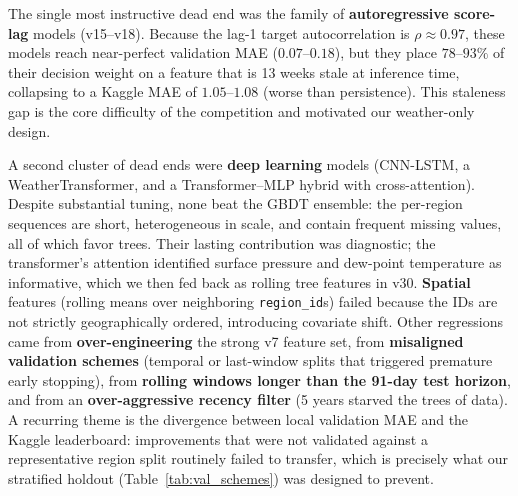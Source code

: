 \documentclass[conference]{IEEEtran}
\begin{document}
The single most instructive dead end was the family of \textbf{autoregressive score-lag} models (v15--v18). Because the lag-1 target autocorrelation is $\rho \approx 0.97$, these models reach near-perfect validation MAE ($0.07$--$0.18$), but they place $78$--$93\%$ of their decision weight on a feature that is 13 weeks stale at inference time, collapsing to a Kaggle MAE of $1.05$--$1.08$ (worse than persistence). This staleness gap is the core difficulty of the competition and motivated our weather-only design.

A second cluster of dead ends were \textbf{deep learning} models (CNN-LSTM, a WeatherTransformer, and a Transformer--MLP hybrid with cross-attention). Despite substantial tuning, none beat the GBDT ensemble: the per-region sequences are short, heterogeneous in scale, and contain frequent missing values, all of which favor trees. Their lasting contribution was diagnostic; the transformer's attention identified surface pressure and dew-point temperature as informative, which we then fed back as rolling tree features in v30. \textbf{Spatial} features (rolling means over neighboring \texttt{region\_id}s) failed because the IDs are not strictly geographically ordered, introducing covariate shift. Other regressions came from \textbf{over-engineering} the strong v7 feature set, from \textbf{misaligned validation schemes} (temporal or last-window splits that triggered premature early stopping), from \textbf{rolling windows longer than the 91-day test horizon}, and from an \textbf{over-aggressive recency filter} (5 years starved the trees of data). A recurring theme is the divergence between local validation MAE and the Kaggle leaderboard: improvements that were not validated against a representative region split routinely failed to transfer, which is precisely what our stratified holdout (Table~\ref{tab:val_schemes}) was designed to prevent.
\end{document}

